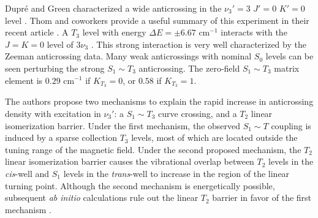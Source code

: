 \documentclass[12pt]{mitthesis}
\begin{document}
Dupr\'{e} and Green characterized a wide anticrossing in the
$\nu_3'=3$ $J'=0$ $K'=0$ level \cite{dupre93}.  Thom and coworkers
provide a useful summary of this experiment in their recent article
\cite{thom07}.  A $T_3$ level with energy $\Delta E = \pm 6.67$
cm$^{-1}$ interacts with the $J=K=0$ level of $3\nu_3$ \cite{thom07,
  dupre93}.  This strong interaction is very well characterized by the
Zeeman anticrossing data.  Many weak anticrossings with nominal $S_0$
levels can be seen perturbing the strong $S_1 \sim T_3$ anticrossing.
The zero-field $S_1 \sim T_3$ matrix element is $0.29$ cm$^{-1}$ if
$K_{T_3}=0$, or $0.58$ if $K_{T_3}=1$.

The authors propose two mechanisms to explain the rapid increase in
anticrossing density with excitation in $\nu_3'$: a $S_1 \sim T_3$
curve crossing, and a $T_2$ linear isomerization barrier.  Under the
first mechanism, the observed $S_1 \sim T$ coupling is induced by a
sparse collection $T_3$ levels, most of which are located outside the
tuning range of the magnetic field.  Under the second proposed
mechanism, the $T_2$ linear isomerization barrier causes the
vibrational overlap between $T_2$ levels in the \emph{cis}-well and
$S_1$ levels in the \emph{trans}-well to increase in the region of the
linear turning point.  Although the second mechanism is energetically
possible, subsequent \emph{ab initio} calculations rule out the linear
$T_2$ barrier in favor of the first mechanism \cite{vacek96,
  sherrill96, cui96, cui97, ventura03}.

\end{document}
